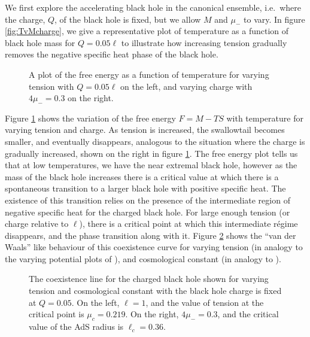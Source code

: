 \documentclass[
twoside,openright,frontopenright]{dmathesis}
\begin{document}
We first explore the accelerating black hole in the canonical ensemble, i.e.\
where the charge, $Q$, of the black hole is fixed, but we allow $M$ and $\mu_-$
to vary.  In figure \ref{fig:TvMcharge}, we give a representative plot of
temperature as a function of black hole mass for $Q=0.05\ell$ to illustrate how
increasing tension gradually removes the negative specific heat phase of the
black hole.
\begin{figure}
\caption{A plot of the free energy as a function of temperature for varying
  tension with $Q=0.05\ell$ on the left, and varying charge with $4\mu_-=0.3$ on
  the right.  }
\label{fig:GvTcharge}
\end{figure}
Figure \ref{fig:GvTcharge} shows the variation of the free energy $F=M-TS$ with
temperature for varying tension and charge. As tension is increased, the
swallowtail becomes smaller, and eventually disappears, analogous to the
situation where the charge is gradually increased, shown on the right in figure
\ref{fig:GvTcharge}. The free energy plot tells us that at low temperatures, we
have the near extremal black hole, however as the mass of the black hole
increases there is a critical value at which there is a spontaneous transition
to a larger black hole with positive specific heat. The existence of this
transition relies on the presence of the intermediate region of negative
specific heat for the charged black hole.  For large enough tension (or charge
relative to $\ell$), there is a critical point at which this intermediate
r\'egime disappears, and the phase transition along with it.  Figure
\ref{fig:coexist} shows the ``van der Waals'' like behaviour of this coexistence
curve for varying tension (in analogy to the varying potential plots of
\cite{Chamblin:1999tk}), and cosmological constant (in analogy to
\cite{Kubiznak:2012wp}).
\begin{figure}
\caption{The coexistence line for the charged black hole shown for varying
  tension and cosmological constant with the black hole charge is fixed at
  $Q=0.05$. On the left, $\ell=1$, and the value of tension at the critical
  point is $\mu_c = 0.219$. On the right, $4\mu_- = 0.3$, and the critical value
  of the AdS radius is $\ell_c = 0.36$.}
\label{fig:coexist}
\end{figure}
\end{document}
